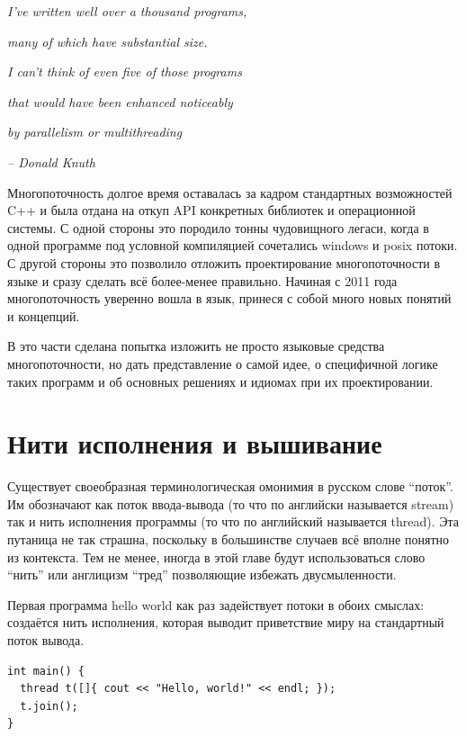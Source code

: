 \documentclass[a4paper,12pt,oneside]{book}
\begin{document}
\hfill\textit{I’ve written well over a thousand programs,}

\hfill\textit{many of which have substantial size.}

\hfill\textit{I can’t think of even five of those programs}

\hfill\textit{that would have been enhanced noticeably}

\hfill\textit{by parallelism or multithreading}{\vspace{0.5em}}

\hfill\textit{-- Donald Knuth}

Многопоточность долгое время оставалась за кадром стандартных возможностей C++ и была отдана на откуп API конкретных библиотек и операционной системы. С одной стороны это породило тонны чудовищного легаси, когда в одной программе под условной компиляцией сочетались windows и posix потоки. С другой стороны это позволило отложить проектирование многопоточности в языке и сразу сделать всё более-менее правильно. Начиная с 2011 года многопоточность уверенно вошла в язык, принеся с собой много новых понятий и концепций.

В это части сделана попытка изложить не просто языковые средства многопоточности, но дать представление о самой идее, о специфичной логике таких программ и об основных решениях и идиомах при их проектировании.

\pagebreak
\section{Нити исполнения и вышивание}\label{sec:threads}

Существует своеобразная терминологическая омонимия в русском слове ``поток''. Им обозначают как поток ввода-вывода (то что по английски называется stream) так и нить исполнения программы (то что по английский называется thread). Эта путаница не так страшна, поскольку в большинстве случаев всё вполне понятно из контекста. Тем не менее, иногда в этой главе будут использоваться слово ``нить'' или англицизм ``тред'' позволяющие избежать двусмыленности.

Первая программа hello world как раз задействует потоки в обоих смыслах: создаётся нить исполнения, которая выводит приветствие миру на стандартный поток вывода.

\begin{lstlisting}
int main() {
  thread t([]{ cout << "Hello, world!" << endl; });
  t.join();
}
\end{lstlisting}
\end{document}

